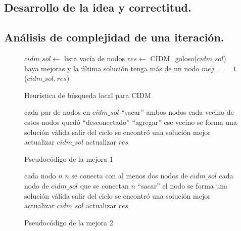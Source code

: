 \subsection{Desarrollo de la idea y correctitud.}

\vspace*{0.3cm}


 
\vspace*{0.6cm}


\subsection{Análisis de complejidad de una iteración.}

\vspace*{0.3cm}

\begin{figure}
\begin{codebox}
\li $cidm\_sol \leftarrow$ lista vacía de nodos
\li $res \leftarrow$ {\sc CIDM_goloso}($cidm\_sol$)
\li \While haya mejoras y la última solución tenga más de un nodo
\li \Do 
		\If $mej == 1$
\li 		{}($cidm\_sol,res$)
\li 		{}
		\End
	\End
\end{codebox}
\caption{Heurística de búsqueda local para CIDM}\label{code:busqueda}
\end{figure}


\begin{figure}
\begin{codebox}
\li \For cada par de nodos en $cidm\_sol$
\li \Do 
		``sacar'' ambos nodos
\li 		\For cada vecino de estos nodos
\li 		\Do 
			\If quedó ``desconectado''
\li			\Then ``agregar'' ese vecino
			\End
\li 			\If se forma una solución válida
\li 			\Then salir del ciclo
			\End
		\End
\li 		\If se encontró una solución mejor
\li 		\Then
			actualizar $cidm\_sol$
\li 			actualizar $res$
\li 			\Return
		\End
	\End
\end{codebox}
\caption{Pseudocódigo de la mejora 1}\label{code:mej1}
\end{figure}



\begin{figure}
\begin{codebox}
\li \For cada nodo $n$
\li \Do 
		\If $n$ se conecta con al menos dos nodos de $cidm\_sol$
\li 		\Then 
			\For cada nodo de $cidm\_sol$ que se conectan $n$
\li 			\Do 
				``sacar'' el nodo
\li 				\If se forma una solución válida
\li 				\Then salir del ciclo
				\End
			\End
\li 		\If se encontró una solución mejor
\li 		\Then
			actualizar $cidm\_sol$
\li 			actualizar $res$
\li 			\Return
		\End
	\End
\end{codebox}
\caption{Pseudocódigo de la mejora 2}\label{code:mej2}
\end{figure}



